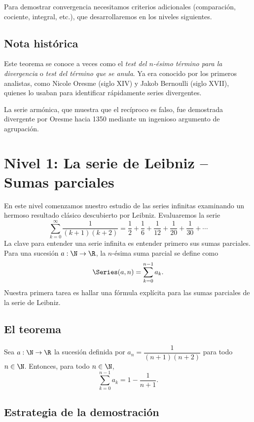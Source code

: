 Para demostrar convergencia necesitamos criterios adicionales (comparación, cociente, integral, etc.), que desarrollaremos en los niveles siguientes.

\subsection{Nota histórica}

Este teorema se conoce a veces como el \emph{test del $n$-ésimo término para la divergencia} o \emph{test del término que se anula}. Ya era conocido por los primeros analistas, como Nicole Oresme (siglo XIV) y Jakob Bernoulli (siglo XVII), quienes lo usaban para identificar rápidamente series divergentes.

La serie armónica, que muestra que el recíproco es falso, fue demostrada divergente por Oresme hacia 1350 mediante un ingenioso argumento de agrupación.

\section{Nivel 1: La serie de Leibniz -- Sumas parciales}

En este nivel comenzamos nuestro estudio de las series infinitas examinando un hermoso resultado clásico descubierto por Leibniz. Evaluaremos la serie
\[
  \sum_{k=0}^{\infty} \frac{1}{(k+1)(k+2)} = \frac12 + \frac16 + \frac1{12} + \frac1{20} + \frac1{30} + \cdots
\]
La clave para entender una serie infinita es entender primero sus sumas parciales. Para una sucesión $a : \N \to \R$, la $n$-ésima suma parcial se define como
\[
  \Series(a, n) = \sum_{k=0}^{n-1} a_k .
\]
Nuestra primera tarea es hallar una fórmula explícita para las sumas parciales de la serie de Leibniz.

\subsection{El teorema}

\begin{teorema}[LeibnizSeries']
Sea $a : \N \to \R$ la sucesión definida por $a_n = \dfrac{1}{(n+1)(n+2)}$ para todo $n \in \N$. Entonces, para todo $n \in \N$,
\[
  \sum_{k=0}^{n-1} a_k = 1 - \frac{1}{n+1} .
\]
\end{teorema}

\subsection{Estrategia de la demostración}

